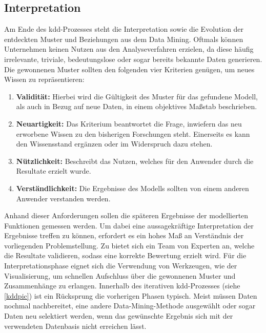 \subsection{Interpretation}
Am Ende des \gls{kdd}-Prozesses steht die Interpretation sowie die Evolution der entdeckten Muster und Beziehungen aus dem Data Mining. Oftmals können Unternehmen keinen Nutzen aus den Analyseverfahren erzielen, da diese häufig irrelevante, triviale, bedeutungslose oder sogar bereits bekannte Daten generieren. Die gewonnenen Muster sollten den folgenden vier Kriterien genügen, um neues Wissen zu repräsentieren:

\begin{enumerate}
\item \textbf{Validität:} Hierbei wird die Gültigkeit des Muster für das gefundene Modell, als auch in Bezug auf neue Daten, in einem objektives Maßstab beschrieben.
\item \textbf{Neuartigkeit:} Das Kriterium beantwortet die Frage, inwiefern das neu erworbene Wissen zu den bisherigen Forschungen steht. Einerseits es kann den Wissensstand ergänzen oder im Widerspruch dazu stehen.
\item \textbf{Nützlichkeit:} Beschreibt das Nutzen, welches für den Anwender durch die Resultate erzielt wurde.
\item \textbf{Verständlichkeit:} Die Ergebnisse des Modells sollten von einem anderen Anwender verstanden werden.
\end{enumerate}

Anhand dieser Anforderungen sollen die späteren Ergebnisse der modellierten Funktionen gemessen werden. Um dabei eine aussagekräftige Interpretation der Ergebnisse treffen zu können, erfordert es ein hohes Maß an Verständnis der vorliegenden Problemstellung. Zu bietet sich ein Team von Experten an, welche die Resultate validieren, sodass eine korrekte Bewertung erzielt wird. Für die Interpretationsphase eignet sich die Verwendung von Werkzeugen, wie der Visualisierung, um schnellen Aufschluss über die gewonnenen Muster und Zusammenhänge zu erlangen. Innerhalb des iterativen \gls{kdd}-Prozesses (siehe \vref{kddpic}) ist ein Rücksprung die vorherigen Phasen typisch. Meist müssen Daten nochmal nachbereitet, eine andere Data-Mining-Methode ausgewählt oder sogar Daten neu selektiert werden, wenn das gewünschte Ergebnis sich mit der verwendeten Datenbasis nicht erreichen lässt.